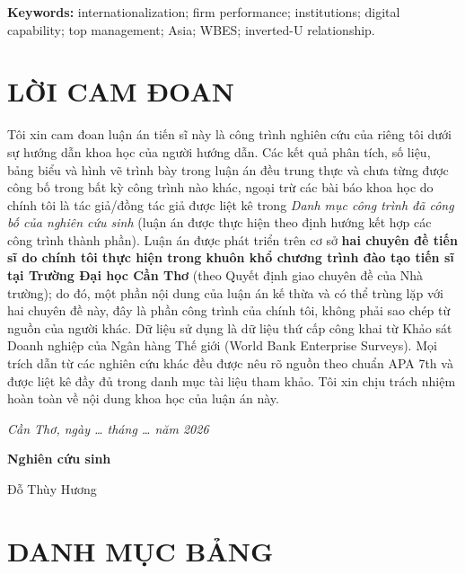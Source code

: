 \documentclass[
  a4paper,
  13pt]{extreport}
\begin{document}
\textbf{Keywords:} internationalization; firm performance; institutions;
digital capability; top management; Asia; WBES; inverted-U relationship.

\newpage

\hypertarget{lux1eddi-cam-ux111oan}{%
\section*{LỜI CAM ĐOAN}\label{lux1eddi-cam-ux111oan}}

Tôi xin cam đoan luận án tiến sĩ này là công trình nghiên cứu của riêng
tôi dưới sự hướng dẫn khoa học của người hướng dẫn. Các kết quả phân
tích, số liệu, bảng biểu và hình vẽ trình bày trong luận án đều trung
thực và chưa từng được công bố trong bất kỳ công trình nào khác, ngoại
trừ các bài báo khoa học do chính tôi là tác giả/đồng tác giả được liệt
kê trong \emph{Danh mục công trình đã công bố của nghiên cứu sinh} (luận
án được thực hiện theo định hướng kết hợp các công trình thành phần).
Luận án được phát triển trên cơ sở \textbf{hai chuyên đề tiến sĩ do
chính tôi thực hiện trong khuôn khổ chương trình đào tạo tiến sĩ tại
Trường Đại học Cần Thơ} (theo Quyết định giao chuyên đề của Nhà trường);
do đó, một phần nội dung của luận án kế thừa và có thể trùng lặp với hai
chuyên đề này, đây là phần công trình của chính tôi, không phải sao chép
từ nguồn của người khác. Dữ liệu sử dụng là dữ liệu thứ cấp công khai từ
Khảo sát Doanh nghiệp của Ngân hàng Thế giới (World Bank Enterprise
Surveys). Mọi trích dẫn từ các nghiên cứu khác đều được nêu rõ nguồn
theo chuẩn APA 7th và được liệt kê đầy đủ trong danh mục tài liệu tham
khảo. Tôi xin chịu trách nhiệm hoàn toàn về nội dung khoa học của luận
án này.

\emph{Cần Thơ, ngày \ldots{} tháng \ldots{} năm 2026}

\textbf{Nghiên cứu sinh}

Đỗ Thùy Hương

\newpage

\renewcommand{\contentsname}{MỤC LỤC}
\setcounter{tocdepth}{3}
\tableofcontents

\newpage

\hypertarget{danh-mux1ee5c-bux1ea3ng}{%
\section*{DANH MỤC BẢNG}\label{danh-mux1ee5c-bux1ea3ng}}
\end{document}

